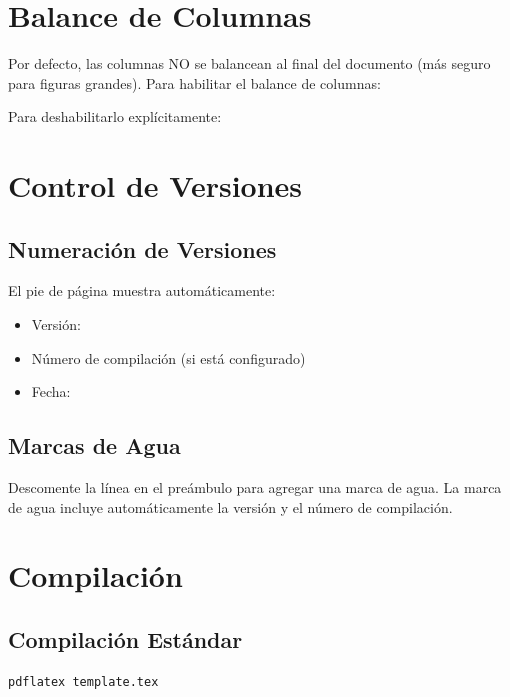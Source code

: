 \documentclass{pt-article}
\begin{document}
\section{Balance de Columnas}

Por defecto, las columnas NO se balancean al final del documento (más seguro
para figuras grandes). Para habilitar el balance de columnas:


Para deshabilitarlo explícitamente:


\section{Control de Versiones}

\subsection{Numeración de Versiones}

El pie de página muestra automáticamente:
\begin{itemize}
    \item Versión: \docversion
    \item Número de compilación (si está configurado)
    \item Fecha: \todayymd
\end{itemize}

\subsection{Marcas de Agua}

Descomente la línea  en el
preámbulo para agregar una marca de agua. La marca de agua incluye
automáticamente la versión y el número de compilación.

\section{Compilación}

\subsection{Compilación Estándar}

\begin{verbatim}
pdflatex template.tex
\end{verbatim}
\end{document}

